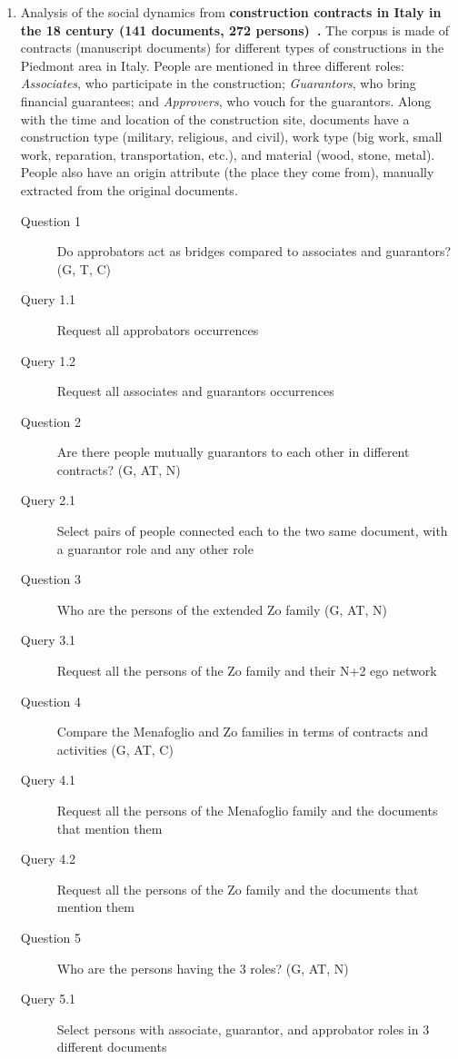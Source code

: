 \begin{enumerate}
    \item Analysis of the social dynamics from \textbf{construction contracts in Italy in the 18 century (141 documents, 272 persons)~\cite{Cristofoli2018}.}
    The corpus is made of contracts (manuscript documents) for different types of constructions in the Piedmont area in Italy. People are mentioned in three different roles: \textit{Associates}, who participate in the construction; \textit{Guarantors}, who bring financial guarantees; and \textit{Approvers}, who vouch for the guarantors. Along with the time and location of the construction site, documents have a construction type (military, religious, and civil), work type (big work, small work, reparation, transportation, etc.), and material (wood, stone, metal). People also have an origin attribute (the place they come from), manually extracted from the original documents.
    \begin{footnotesize}
    \begin{description}
    \item[Question 1] Do approbators act as bridges compared to associates and guarantors? (G, T, C)
    \item[\myindent Query 1.1] Request all approbators occurrences
    \item[\myindent Query 1.2 ] Request all associates and guarantors occurrences
    \item[Question 2] Are there people mutually guarantors to each other in different contracts? (G, AT, N)
    \item[\myindent Query 2.1] Select pairs of people connected each to the two same document, with a guarantor role and any other role
    \item[Question 3] Who are the persons of the extended Zo family (G, AT, N)
    \item[\myindent Query 3.1] Request all the persons of the Zo family and their N+2 ego network
    \item[Question 4] Compare the Menafoglio and Zo families in terms of contracts and activities (G, AT, C)
    \item[\myindent Query 4.1] Request all the persons of the Menafoglio family and the documents that mention them
    \item[\myindent Query 4.2] Request all the persons of the Zo family and  the documents that mention them
    \item[Question 5] Who are the persons having the 3 roles? (G, AT, N)
    \item[\myindent Query 5.1] Select persons with associate, guarantor, and approbator roles in 3 different documents

\end{description}
\end{footnotesize}
\end{enumerate}
